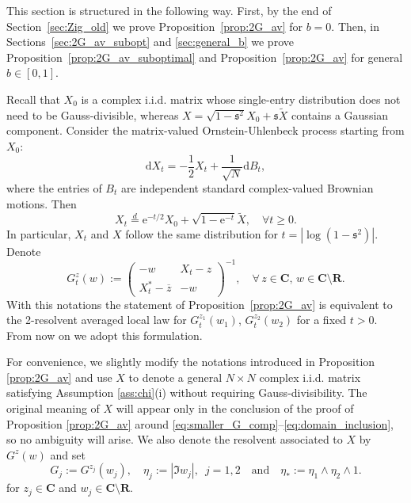 \documentclass[10pt]{amsart}
\numberwithin{equation}{section}
\newcommand{\dif}{\mathrm{d}}
\newcommand{\R}{\mathbf{R}}
\newcommand{\C}{\mathbf{C}}
\newcommand{\X}{\mathcal{X}}
\newcommand{\ee}{\mathrm{e}}
\begin{document}
This section is structured in the following way. First, by the end of Section~\ref{sec:Zig_old} we prove Proposition~\ref{prop:2G_av} for $b=0$. Then, in Sections~\ref{sec:2G_av_subopt} and \ref{sec:general_b} we prove Proposition~\ref{prop:2G_av_suboptimal} and Proposition~\ref{prop:2G_av} for general $b\in [0,1]$.


Recall that $X_0$ is a complex i.i.d. matrix whose single-entry distribution does not need to be Gauss-divisible, whereas $X=\sqrt{1-\mathfrak{s}^2}X_0+\mathfrak{s}\widetilde{X}$ contains a Gaussian component. Consider the matrix-valued Ornstein-Uhlenbeck process starting from $X_0$:
\begin{equation}
\dif X_t = -\frac{1}{2}X_t + \frac{1}{\sqrt{N}}\dif B_t,
\label{eq:OU}
\end{equation}
where the entries of $B_t$ are independent standard complex-valued Brownian motions. Then
\begin{equation}
X_t\stackrel{d}{=}\ee^{-t/2}X_0 + \sqrt{1-\ee^{-t}}\widetilde{X},\quad \forall t\ge 0.
\label{eq:OU_distr}
\end{equation}
In particular, $X_t$ and $X$ follow the same distribution for $t=|\log(1-\mathfrak{s}^2)|$. Denote 
\begin{equation}
\label{eq:defres}
G_t^{z}(w):=\begin{pmatrix}
-w&X_t-z\\X_t^*-\overline{z}&-w
\end{pmatrix}^{-1},\quad \forall \, z\in\C,\, w\in\C\setminus\R. 
\end{equation}
With this notations the statement of Proposition~\ref{prop:2G_av} is equivalent to the 2-resolvent averaged local law for $G_t^{z_1}(w_1)$, $G^{z_2}_t(w_2)$ for a fixed $t>0$. From now on we adopt this formulation.


For convenience, we slightly modify the notations introduced in Proposition \ref{prop:2G_av} and use $X$ to denote a general $N\times N$ complex i.i.d. matrix satisfying Assumption \ref{ass:chi}(i) without requiring Gauss-divisibility. The original meaning of $X$ will appear only in the conclusion of the proof of Proposition \ref{prop:2G_av} around \eqref{eq:smaller_G_comp}--\eqref{eq:domain_inclusion}, so no ambiguity will arise. We also denote the resolvent associated to $X$ by $G^z(w)$ and set
\begin{equation}
G_j:=G^{z_j}(w_j),\quad \eta_j:=|\Im w_j|,\,\,\, j=1,2\quad \text{and}\quad \eta_*:=\eta_1\wedge\eta_2\wedge 1.
\end{equation}
for $z_j\in\C$ and $w_j\in\C\setminus\R$. 
\end{document}
